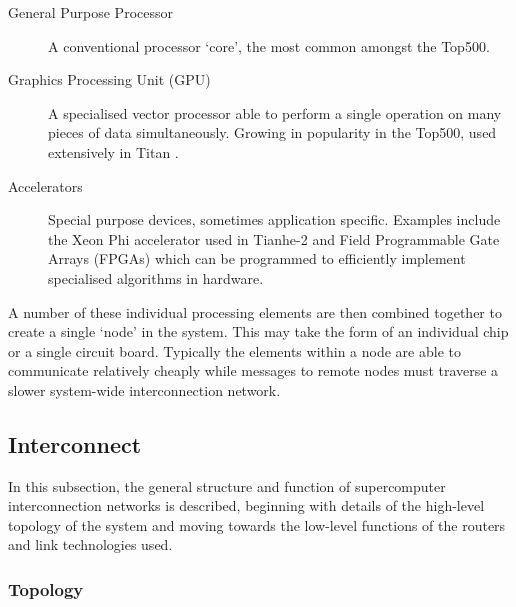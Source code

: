 			\begin{description}
				
				\item[General Purpose Processor] A conventional processor `core', the
				most common amongst the Top500.
				
				\item[Graphics Processing Unit (GPU)] A specialised vector processor
				able to perform a single operation on many pieces of data
				simultaneously. Growing in popularity in the Top500, used extensively in
				Titan \cite{bland12}.
				
				\item[Accelerators] Special purpose devices, sometimes application
				specific. Examples include the Xeon Phi accelerator used in Tianhe-2
				\cite{dongarra13} and Field Programmable Gate Arrays (FPGAs) which can
				be programmed to efficiently implement specialised algorithms in
				hardware.
				
			\end{description}
			
			A number of these individual processing elements are then combined
			together to create a single `node' in the system. This may take the form
			of an individual chip or a single circuit board. Typically the elements
			within a node are able to communicate relatively cheaply while messages to
			remote nodes must traverse a slower system-wide interconnection network.
		
		\subsection{Interconnect}
			
			In this subsection, the general structure and function of supercomputer
			interconnection networks is described, beginning with details of the
			high-level topology of the system and moving towards the low-level
			functions of the routers and link technologies used.
			
			\subsubsection{Topology}
				
				
